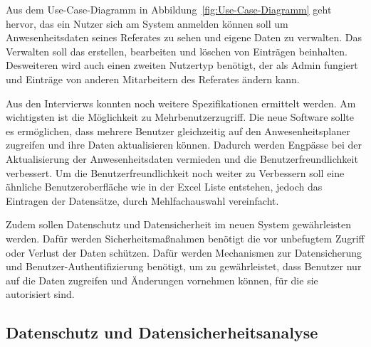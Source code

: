 Aus dem Use-Case-Diagramm in Abbildung~\ref{fig:Use-Case-Diagramm} geht hervor, das ein Nutzer sich am System anmelden können soll um Anwesenheitsdaten seines Referates zu sehen und eigene Daten zu verwalten. Das Verwalten soll das erstellen, bearbeiten und löschen von Einträgen beinhalten. Desweiteren wird auch einen zweiten Nutzertyp benötigt, der als Admin fungiert und Einträge von anderen Mitarbeitern des Referates ändern kann.

Aus den Intervierws konnten noch weitere Spezifikationen ermittelt werden. Am wichtigsten ist die Möglichkeit zu Mehrbenutzerzugriff. Die neue Software sollte es ermöglichen, dass mehrere Benutzer gleichzeitig auf den Anwesenheitsplaner zugreifen und ihre Daten aktualisieren können. Dadurch werden Engpässe bei der Aktualisierung der Anwesenheitsdaten vermieden und die Benutzerfreundlichkeit verbessert. Um die Benutzerfreundlichkeit noch weiter zu Verbessern soll eine ähnliche Benutzeroberfläche wie in der Excel Liste entstehen, jedoch das Eintragen der Datensätze, durch \zB Mehlfachauswahl vereinfacht.

Zudem sollen Datenschutz und Datensicherheit im neuen System gewährleisten werden. Dafür werden Sicherheitsmaßnahmen benötigt die vor unbefugtem Zugriff oder Verlust der Daten schützen. Dafür werden Mechanismen zur Datensicherung und Benutzer-Authentifizierung benötigt, um zu gewährleistet, dass Benutzer nur auf die Daten zugreifen und Änderungen vornehmen können, für die sie autorisiert sind.

\subsection{ Datenschutz und Datensicherheitsanalyse}
\label{sec:Datenschutz}
